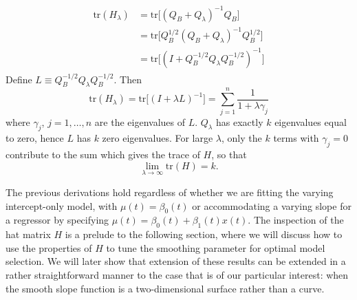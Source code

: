 \documentclass[12pt]{article}
\theoremstyle{definition}
\begin{document}
\begin{enumerate}
\begin{description}
\begin{align}
\begin{split}
\mbox{tr}\left(H_\lambda \right) &= \mbox{tr}\bigg[ \left(Q_B + Q_\lambda \right)^{-1}Q_B \bigg]\\
&=\mbox{tr}\bigg[ Q_B^{1/2}\left(Q_B + Q_\lambda \right)^{-1}Q_B^{1/2} \bigg] \\
&=\mbox{tr}\bigg[\left(I + Q_B^{-{1/2}}Q_\lambda Q_B^{-{1/2}} \right)^{-1} \bigg]
\end{split}
\end{align}
Define $L \equiv Q_B^{-{1/2}}Q_\lambda Q_B^{-{1/2}}$. Then
\begin{equation}
\mbox{tr}\left(H_\lambda \right) = \mbox{tr}\bigg[\left(I + \lambda L \right)^{-1} \bigg] = \sum_{j=1}^n \frac{1}{1 + \lambda \gamma_j}
\end{equation}
 where $\gamma_j$, $j=1,\dots,n$ are the eigenvalues of $L$. $Q_\lambda$ has exactly $k$ eigenvalues equal to zero, hence $L$ has $k$ zero eigenvalues. For large $\lambda$, only the $k$ terms with $\gamma_j=0$ contribute to the sum which gives the trace of $H$, so that
 \[
\lim_{\lambda \rightarrow \infty  } \mbox{tr}\left(H\right) = k.
 \]
\end{description}
\end{enumerate}

The previous derivations hold regardless of whether we are fitting the varying intercept-only model, with $\mu\left( t\right) = \beta_0\left(t\right)$ or accommodating a varying slope for a regressor by specifying $\mu\left( t\right) = \beta_0\left(t\right) + \beta_1\left(t\right)x\left(t\right)$. The inspection of the hat matrix $H$ is a prelude to the following section, where we will discuss how to use the properties of $H$ to tune the smoothing parameter for optimal model selection. We will later show that extension of these results can be extended in a rather straightforward manner to the case that is of our particular interest: when the smooth slope function is a two-dimensional surface rather than a curve.
\end{document}
